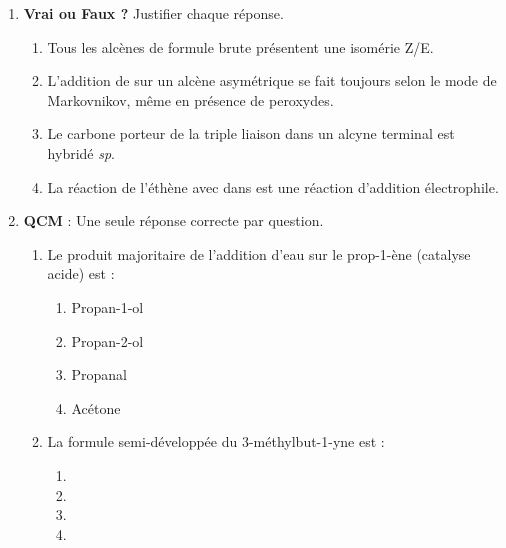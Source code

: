 \documentclass[11pt]{article}
\begin{document}
\begin{exercice}
\begin{enumerate}
    \item \textbf{Vrai ou Faux ?} Justifier chaque réponse.
    \begin{enumerate}
        \item Tous les alcènes de formule brute  présentent une isomérie Z/E.
        \item L'addition de  sur un alcène asymétrique se fait toujours selon le mode de Markovnikov, même en présence de peroxydes.
        \item Le carbone porteur de la triple liaison dans un alcyne terminal est hybridé \textit{sp}.
        \item La réaction de l'éthène avec  dans  est une réaction d'addition électrophile.
    \end{enumerate}
    \item \textbf{QCM} : Une seule réponse correcte par question.
    \begin{enumerate}
        \item Le produit majoritaire de l'addition d'eau sur le prop-1-ène (catalyse acide) est :
        \begin{enumerate}
            \item Propan-1-ol
            \item Propan-2-ol
            \item Propanal
            \item Acétone
        \end{enumerate}
        \item La formule semi-développée du 3-méthylbut-1-yne est :
        \begin{enumerate}
            \item {}
            \item {}
            \item {}
            \item {}
        \end{enumerate}
    \end{enumerate}
\end{enumerate}
\end{exercice}
\end{document}
